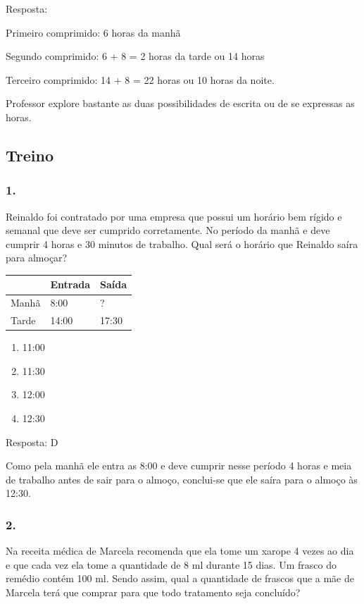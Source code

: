 Resposta:

Primeiro comprimido: 6 horas da manhã

Segundo comprimido: 6 + 8 = 2 horas da tarde ou 14 horas

Terceiro comprimido: 14 + 8 = 22 horas ou 10 horas da noite.

Professor explore bastante as duas possibilidades de escrita ou de se
expressas as horas.

\subsection{Treino}\label{treino-3}

\subsubsection{1.}\label{section-49}

Reinaldo foi contratado por uma empresa que possui um horário bem rígido
e semanal que deve ser cumprido corretamente. No período da manhã e deve
cumprir 4 horas e 30 minutos de trabalho. Qual será o horário que
Reinaldo saíra para almoçar?

\begin{longtable}[]{@{}lll@{}}
\toprule
& Entrada & Saída\tabularnewline
\midrule
\endhead
Manhã & 8:00 & ?\tabularnewline
Tarde & 14:00 & 17:30\tabularnewline
\bottomrule
\end{longtable}

\begin{enumerate}
\def\labelenumi{\alph{enumi})}
\item
  11:00
\item
  11:30
\item
  12:00
\item
  12:30
\end{enumerate}

Resposta: D

Como pela manhã ele entra as 8:00 e deve cumprir nesse período 4 horas e
meia de trabalho antes de sair para o almoço, conclui-se que ele saíra
para o almoço às 12:30.

\subsubsection{2.}\label{section-50}

Na receita médica de Marcela recomenda que ela tome um xarope 4 vezes ao
dia e que cada vez ela tome a quantidade de 8 ml durante 15 dias. Um
frasco do remédio contém 100 ml. Sendo assim, qual a quantidade de
frascos que a mãe de Marcela terá que comprar para que todo tratamento
seja concluído?

